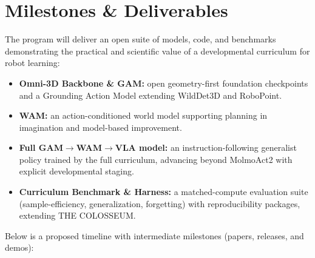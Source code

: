 \documentclass[11pt]{article}
\begin{document}
\section{Milestones \& Deliverables}

The program will deliver an open suite of models, code, and benchmarks demonstrating the practical and scientific value of a developmental curriculum for robot learning:

\begin{itemize}
\item \textbf{Omni-3D Backbone \& GAM:} open geometry-first foundation checkpoints and a Grounding Action Model extending WildDet3D\cite{wilddet3d} and RoboPoint.\cite{robopoint}
\item \textbf{WAM:} an action-conditioned world model supporting planning in imagination and model-based improvement.
\item \textbf{Full GAM$\rightarrow$WAM$\rightarrow$VLA model:} an instruction-following generalist policy trained by the full curriculum, advancing beyond MolmoAct2\cite{molmoact2} with explicit developmental staging.
\item \textbf{Curriculum Benchmark \& Harness:} a matched-compute evaluation suite (sample-efficiency, generalization, forgetting) with reproducibility packages, extending THE COLOSSEUM.\cite{colosseum}
\end{itemize}

Below is a proposed timeline with intermediate milestones (papers, releases, and demos):
\end{document}
